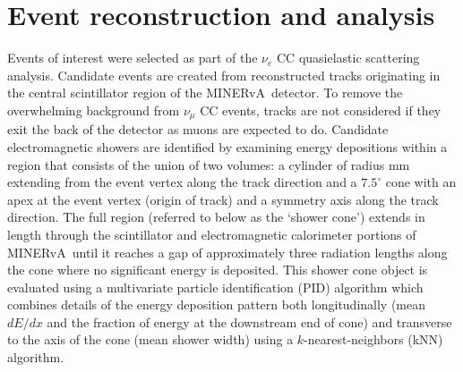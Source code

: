 \documentclass[%
preprint,
 amsmath,amssymb,
 aps,
]{revtex4-1}
\newcommand{\minerva}{\mbox{MINERvA}}
\newcommand{\nue}[0]{\nu_{e}}
\begin{document}
\section{\label{reconanal}Event reconstruction and analysis}

Events of interest were selected as part of the $\nue$ CC quasielastic scattering analysis\cite{minervaNueCCQE}\cite{JWthesis}.  
Candidate events are created from reconstructed tracks originating in the central scintillator region of the \minerva\ detector\cite{MINERvA_NIM}. To remove the overwhelming background from $\nu_{\mu}$ CC events, tracks are not considered if they exit the back of the detector as muons are expected to do.  Candidate electromagnetic showers are identified by examining  energy depositions within a region that consists of the union of two volumes:  a cylinder of  radius \unit[50]{mm} extending from the event vertex along the track direction and a 
$7.5^{\circ}$ cone with an apex at the event vertex (origin of track) and a symmetry axis along the track direction.  
The full region (referred to below as the `shower cone') extends in length through the scintillator and electromagnetic calorimeter portions of \minerva\ until it reaches a gap of approximately three radiation lengths along the cone where no significant energy is deposited.  This shower cone object is evaluated using a multivariate particle identification (PID) algorithm which combines details of the energy deposition pattern both longitudinally (mean $dE/dx$ and the fraction of energy at the downstream end of cone) and transverse to the axis of the cone (mean shower width) using a $k$-nearest-neighbors (kNN) algorithm\cite{knnref}.  
\end{document}
